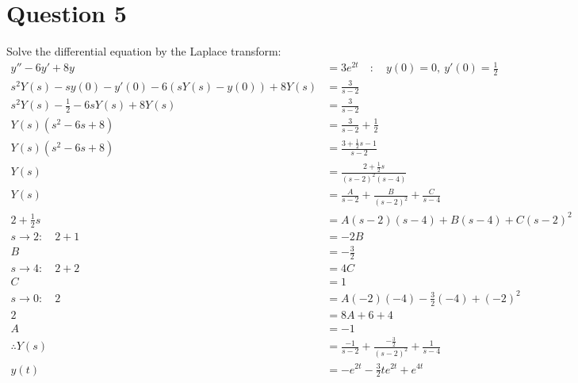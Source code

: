 \documentclass{article}
\begin{document}
\section*{Question 5}
Solve the differential equation by the Laplace transform:
\begin{align*}
    y''-6y'+8y                               & =3e^{2t}\quad:\quad y(0)=0,\ y'(0)=\frac{1}{2}          \\
    s^2Y(s)-sy(0)-y'(0) -6(sY(s)-y(0))+8Y(s) & = \frac{3}{s-2}                                         \\
    s^2Y(s)-\frac{1}{2} -6sY(s)+8Y(s)        & = \frac{3}{s-2}                                         \\
    Y(s)(s^2-6s+8)                           & = \frac{3}{s-2}+\frac{1}{2}                             \\
    Y(s)(s^2-6s+8)                           & = \frac{3+\frac{1}{2}s-1}{s-2}                          \\
    Y(s)                                     & = \frac{2+\frac12s}{(s-2)^2(s-4)}                       \\
    Y(s)                                     & = \frac{A}{s-2}+\frac{B}{(s-2)^2}+\frac{C}{s-4}         \\
    2+\frac12s                               & = A(s-2)(s-4)+B(s-4)+C(s-2)^2                           \\
    s\to2:\quad 2+1                          & = -2B                                                   \\
    B                                        & = -\frac{3}{2}                                          \\
    s\to4:\quad 2+2                          & = 4C                                                    \\
    C                                        & = 1                                                     \\
    s\to0:\quad 2                            & = A(-2)(-4) -\frac32(-4)+(-2)^2                         \\
    2                                        & = 8A+6+4                                                \\
    A                                        & = -1                                                    \\
    \therefore Y(s)                          & = \frac{-1}{s-2}+\frac{-\frac32}{(s-2)^2}+\frac{1}{s-4} \\
    y(t)                                     & = -e^{2t}-\frac32te^{2t}+e^{4t}                         \\
\end{align*}
\end{document}
